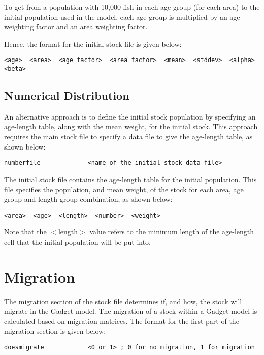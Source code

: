 \documentclass[10pt,twoside]{book}
\begin{document}
\bigskip
To get from a population with 10,000 fish in each age group (for each area) to the initial population used in the model, each age group is multiplied by an age weighting factor and an area weighting factor.

\bigskip
Hence, the format for the initial stock file is given below:

{\small\begin{verbatim}
<age>  <area>  <age factor>  <area factor>  <mean>  <stddev>  <alpha>  <beta>
\end{verbatim}}

\subsection{Numerical Distribution}
An alternative approach is to define the initial stock population by specifying an age-length table, along with the mean weight, for the initial stock.  This approach requires the main stock file to specify a data file to give the age-length table, as shown below:

{\small\begin{verbatim}
numberfile             <name of the initial stock data file>
\end{verbatim}}

The initial stock file contains the age-length table for the initial population.  This file specifies the population, and mean weight, of the stock for each area, age group and length group combination, as shown below:

{\small\begin{verbatim}
<area>  <age>  <length>  <number>  <weight>
\end{verbatim}}

Note that the $<$length$>$ value refers to the minimum length of the age-length cell that the initial population will be put into.

\section{Migration}\label{sec:stockmigrate}
The migration section of the stock file determines if, and how, the stock will migrate in the Gadget model.  The migration of a stock within a Gadget model is calculated based on migration matrices.  The format for the first part of the migration section is given below:

{\small\begin{verbatim}
doesmigrate            <0 or 1> ; 0 for no migration, 1 for migration
\end{verbatim}}
\end{document}
